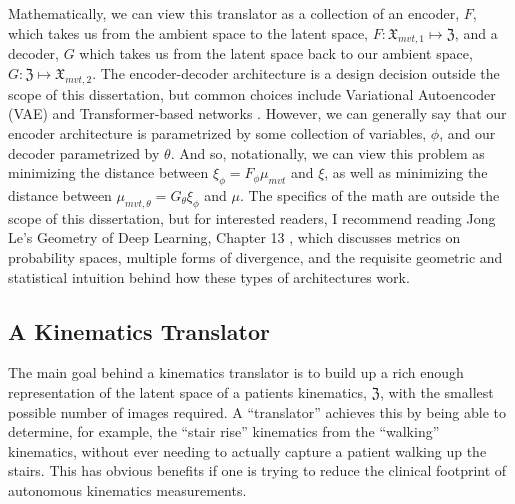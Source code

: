 Mathematically, we can view this translator as a collection of an encoder, $F$, which takes us from the ambient space to the latent space, $F: \mathfrak{X}_{mvt,1} \mapsto \mathfrak{Z}$, and a decoder, $G$ which takes us from the latent space back to our ambient space, $G: \mathfrak{Z} \mapsto \mathfrak{X}_{mvt,2}$. The encoder-decoder architecture is a design decision outside the scope of this dissertation, but common choices include Variational Autoencoder (VAE) and Transformer-based networks \cite{vaswaniAttentionAllYou2017}.
However, we can generally say that our encoder architecture is parametrized by some collection of variables, $\phi$, and our decoder parametrized by $\theta$.
And so, notationally, we can view this problem as minimizing the distance between $\xi_{\phi} = F_{\phi}\mu_{mvt}$ and $\xi$, as well as minimizing the distance between $\mu_{mvt,\theta} = G_{\theta}\xi_{\phi}$ and $\mu$.
The specifics of the math are outside the scope of this dissertation, but for interested readers, I recommend reading Jong Le's Geometry of Deep Learning, Chapter 13 \cite{yeGeometryDeepLearning2022}, which discusses metrics on probability spaces, multiple forms of divergence, and the requisite geometric and statistical intuition behind how these types of architectures work.

\subsection{A Kinematics Translator}
The main goal behind a kinematics translator is to build up a rich enough representation of the latent space of a patients kinematics, $\mathfrak{Z}$, with the smallest possible number of images required.
A ``translator'' achieves this by being able to determine, for example, the ``stair rise'' kinematics from the ``walking'' kinematics, without ever needing to actually capture a patient walking up the stairs.
This has obvious benefits if one is trying to reduce the clinical footprint of autonomous kinematics measurements.

